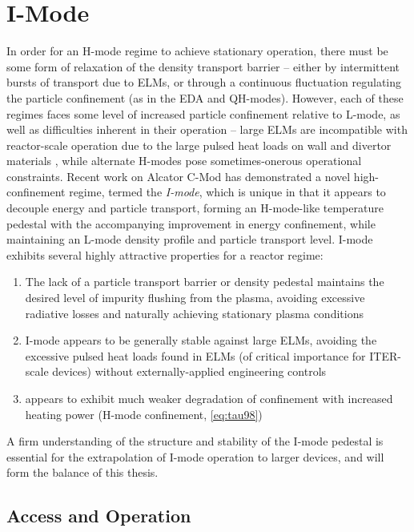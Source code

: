 \section{I-Mode}\label{sec:hcr_imode}

In order for an H-mode regime to achieve stationary operation, there must be some form of relaxation of the density transport barrier -- either by intermittent bursts of transport due to ELMs, or through a continuous fluctuation regulating the particle confinement (as in the EDA and QH-modes).  However, each of these regimes faces some level of increased particle confinement relative to L-mode, as well as difficulties inherent in their operation -- large ELMs are incompatible with reactor-scale operation due to the large pulsed heat loads on wall and divertor materials \cite{Federici2003,Loarte2003}, while alternate H-modes pose sometimes-onerous operational constraints.  Recent work on Alcator C-Mod has demonstrated a novel high-confinement regime, termed the \emph{I-mode}, which is unique in that it appears to decouple energy and particle transport, forming an H-mode-like temperature pedestal with the accompanying improvement in energy confinement, while maintaining an L-mode density profile and particle transport level.  I-mode exhibits several highly attractive properties for a reactor regime:

\begin{enumerate}
 \item The lack of a particle transport barrier or density pedestal maintains the desired level of impurity flushing from the plasma, avoiding excessive radiative losses and naturally achieving stationary plasma conditions
 \item I-mode appears to be generally stable against large ELMs, avoiding the excessive pulsed heat loads found in ELMs (of critical importance for ITER-scale devices) without externally-applied engineering controls
 \item appears to exhibit much weaker degradation of confinement with increased heating power (\cf H-mode confinement, \cref{eq:tau98})
\end{enumerate}

\noindent A firm understanding of the structure and stability of the I-mode pedestal is essential for the extrapolation of I-mode operation to larger devices, and will form the balance of this thesis.

\subsection{Access and Operation}\label{subsec:hcr_imode_access}

